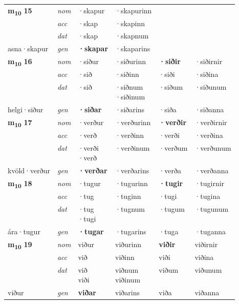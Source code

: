 \begin{longtable}[l]{X>{\footnotesize\itshape}XXXXX}
\multirow{3}{*}{{{\textbf{m{\textsubscript{10}}} \Large{\textbf{15}}}}} & nom & ·skapur & ·skapurinn & \textbf{} &  \\*
 & acc & ·skap & ·skapinn &  &  \\*
 & dat & ·skap & ·skapnum &  &  \\*
 {\footnotesize{asna\allowbreak ·skapur}} & gen & \textbf{·skapar} & ·skaparins &  &  \\
\midrule

\multirow{3}{*}{{{\textbf{m{\textsubscript{10}}} \Large{\textbf{16}}}}} & nom & ·siður & ·siðurinn & \textbf{·siðir} & ·siðirnir \\*
 & acc & ·sið & ·siðinn & ·siði & ·siðina \\*
 & dat & ·sið & \specialcell{·siðnum\\  ·siðinum} & ·siðum & ·siðunum \\*
 {\footnotesize{helgi\allowbreak ·siður}} & gen & \textbf{·siðar} & ·siðarins & ·siða & ·siðanna \\
\midrule

\multirow{3}{*}{{{\textbf{m{\textsubscript{10}}} \Large{\textbf{17}}}}} & nom & ·verður & ·verðurinn & \textbf{·verðir} & ·verðirnir \\*
 & acc & ·verð & ·verðinn & ·verði & ·verðina \\*
 & dat & \specialcell{·verði\\  ·verð} & ·verðinum & ·verðum & ·verðunum \\*
 {\footnotesize{kvöld\allowbreak ·verður}} & gen & \textbf{·verðar} & ·verðarins & ·verða & ·verðanna \\
\midrule

\multirow{3}{*}{{{\textbf{m{\textsubscript{10}}} \Large{\textbf{18}}}}} & nom & ·tugur & ·tugurinn & \textbf{·tugir} & ·tugirnir \\*
 & acc & ·tug & ·tuginn & ·tugi & ·tugina \\*
 & dat & \specialcell{·tug\\  ·tugi} & ·tugnum & ·tugum & ·tugunum \\*
 {\footnotesize{ára\allowbreak ·tugur}} & gen & \textbf{·tugar} & ·tugarins & ·tuga & ·tuganna \\
\midrule

\multirow{3}{*}{{{\textbf{m{\textsubscript{10}}} \Large{\textbf{19}}}}} & nom & viður & viðurinn & \textbf{viðir} & viðirnir \\*
 & acc & við & viðinn & viði & viðina \\*
 & dat & \specialcell{við\\ viði} & \specialcell{viðnum\\ viðinum} & viðum & viðunum \\*
 {\footnotesize{viður}} & gen & \textbf{viðar} & viðarins & viða & viðanna \\
\midrule


\end{longtable}

